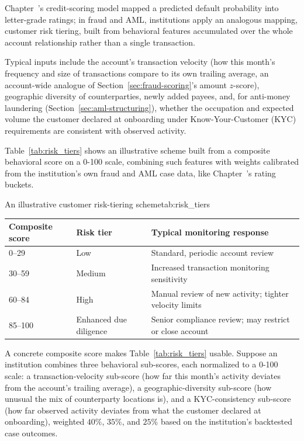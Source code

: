\documentclass[../ai_in_finance]{subfiles}
\begin{document}
Chapter~'s credit-scoring model mapped a predicted default probability into letter-grade ratings; in fraud and AML, institutions apply an analogous mapping, customer risk tiering, built from behavioral features accumulated over the whole account relationship rather than a single transaction.

Typical inputs include the account's transaction velocity (how this month's frequency and size of transactions compare to its own trailing average, an account-wide analogue of Section~\ref{sec:fraud-scoring}'s amount $z$-score), geographic diversity of counterparties, newly added payees, and, for anti-money laundering (Section~\ref{sec:aml-structuring}), whether the occupation and expected volume the customer declared at onboarding under Know-Your-Customer (KYC) requirements are consistent with observed activity.

Table~\ref{tab:risk_tiers} shows an illustrative scheme built from a composite behavioral score on a 0-100 scale, combining such features with weights calibrated from the institution's own fraud and AML case data, like Chapter~'s rating buckets.

\begin{booktable}[htbp]{An illustrative customer risk-tiering scheme}{tab:risk_tiers}
\begin{tabular}{lll}
\toprule
Composite score & Risk tier & Typical monitoring response \\
\midrule
0--29 & Low & Standard, periodic account review \\
30--59 & Medium & Increased transaction monitoring sensitivity \\
60--84 & High & Manual review of new activity; tighter velocity limits \\
85--100 & Enhanced due diligence & Senior compliance review; may restrict or close account \\
\bottomrule
\end{tabular}
\end{booktable}

A concrete composite score makes Table~\ref{tab:risk_tiers} usable. Suppose an institution combines three behavioral sub-scores, each normalized to a 0-100 scale: a transaction-velocity sub-score (how far this month's activity deviates from the account's trailing average), a geographic-diversity sub-score (how unusual the mix of counterparty locations is), and a KYC-consistency sub-score (how far observed activity deviates from what the customer declared at onboarding), weighted $40\%$, $35\%$, and $25\%$ based on the institution's backtested case outcomes.
\end{document}
